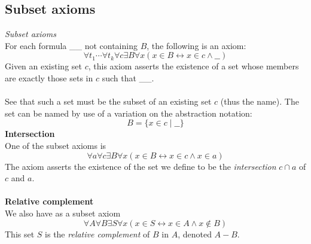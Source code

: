 \documentclass{report}
\begin{document}
\subsection{Subset axioms}
\textit{Subset axioms}\\
For each formula \_\_ not containing $B$, the following is an axiom:
\begin{equation*}
\forall t_1\cdots\forall t_k\forall c\exists B\forall x(x\in B\leftrightarrow x\in c\land\_\_)
\end{equation*}
Given an existing set $c$, this axiom asserts the existence of a set whose members are exactly those sets in $c$ such that \_\_.\\
\vspace{1mm}\\
See that such a set must be the subset of an existing set $c$ (thus the name). The set can be named by use of a variation on the abstraction notation:
\begin{equation*}
B=\{x\in c\mid\_\_\}
\end{equation*}
\textbf{Intersection}\\
One of the subset axioms is
\begin{equation*}
\forall a\forall c\exists B\forall x(x\in B\leftrightarrow x\in c\land x\in a)
\end{equation*}
The axiom asserts the existence of the set we define to be the \textit{intersection} $c\cap a$ of $c$ and $a$.\\
\vspace{1mm}\\
\textbf{Relative complement}\\
We also have as a subset axiom 
\begin{equation*}
\forall A\forall B\exists S\forall x(x\in S\leftrightarrow x\in A\land x\notin B)
\end{equation*}
This set $S$ is the \textit{relative complement} of $B$ in $A$, denoted $A-B$.
\newpage
\end{document}
